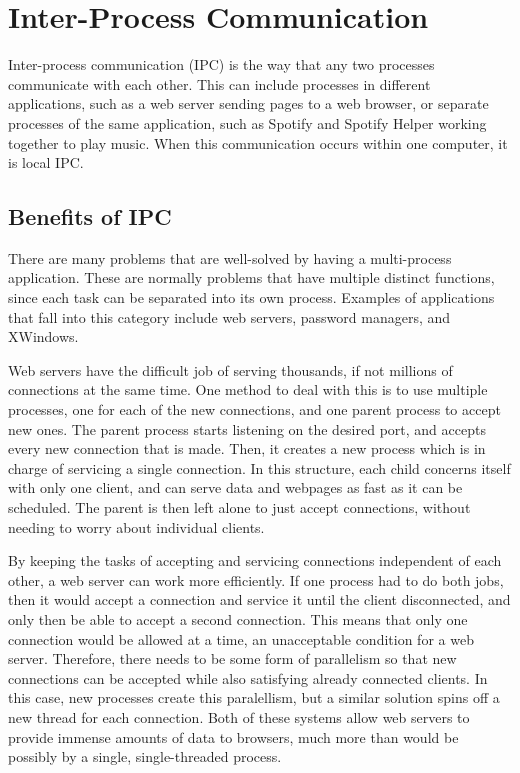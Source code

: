 \chapter{Inter-Process Communication}
\label{sec:interProcessCommunication}

Inter-process communication (IPC) is the way that any two processes communicate with each other.  This can include processes in different applications, such as a web server sending pages to a web browser, or separate processes of the same application, such as Spotify and Spotify Helper working together to play music.  When this communication occurs within one computer, it is local IPC.


\section{Benefits of IPC}
\label{sec:benefitsOfIPC}
There are many problems that are well-solved by having a multi-process application.  These are normally problems that have multiple distinct functions, since each task can be separated into its own process.  Examples of applications that fall into this category include web servers, password managers, and XWindows.

Web servers have the difficult job of serving thousands, if not millions of connections at the same time.  One method to deal with this is to use multiple processes, one for each of the new connections, and one parent process to accept new ones.  The parent process starts listening on the desired port, and accepts every new connection that is made.  Then, it creates a new process which is in charge of servicing a single connection.  In this structure, each child concerns itself with only one client, and can serve data and webpages as fast as it can be scheduled.  The parent is then left alone to just accept connections, without needing to worry about individual clients.

By keeping the tasks of accepting and servicing connections independent of each other, a web server can work more efficiently.  If one process had to do both jobs, then it would accept a connection and service it until the client disconnected, and only then be able to accept a second connection.  This means that only one connection would be allowed at a time, an unacceptable condition for a web server.  Therefore, there needs to be some form of parallelism so that new connections can be accepted while also satisfying already connected clients.  In this case, new processes create this paralellism, but a similar solution spins off a new thread for each connection.  Both of these systems allow web servers to provide immense amounts of data to browsers, much more than would be possibly by a single, single-threaded process.

